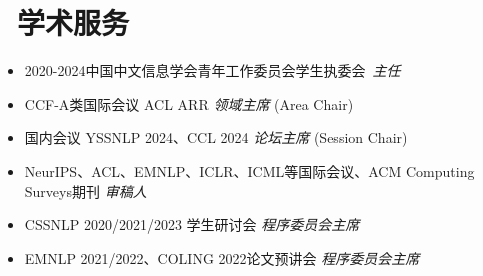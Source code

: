 \documentclass{resume}
\begin{document}
\section{\textcolor{red1}{\faStreetView\ 学术服务}}
\begin{itemize}[parsep=0.3ex]
    \item 2020-2024中国中文信息学会青年工作委员会学生执委会\ \textcolor{red2}{\textit{主任}}
    \item CCF-A类国际会议 ACL ARR \textcolor{red2}{\textit{领域主席}} (Area Chair)
    \item 国内会议 YSSNLP 2024、CCL 2024 \textcolor{red2}{\textit{论坛主席}} (Session Chair)
    \item NeurIPS、ACL、EMNLP、ICLR、ICML等国际会议、ACM Computing Surveys期刊 \textcolor{red2}{\textit{审稿人}}
    \item CSSNLP 2020/2021/2023 学生研讨会 \textit{程序委员会主席}
    \item EMNLP 2021/2022、COLING 2022论文预讲会 \textit{程序委员会主席}
\end{itemize}
\end{document}
